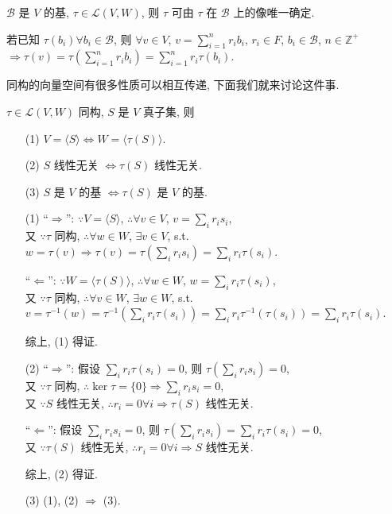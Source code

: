 \documentclass{note}
\begin{document}
\begin{thm}[(课本定理 2.2)]\label{thm-2.4}
    $\mathcal{B}$ 是 $V$ 的基, $\tau\in\mathcal{L}(V,W)$, 则 $\tau$ 可由 $\tau$ 在 $\mathcal{B}$ 上的像唯一确定.
\end{thm}
\begin{pf}
    若已知 $\tau(b_i)\forall b_i\in\mathcal{B}$, 则 $\forall v\in V$, $v=\sum_{i=1}^nr_ib_i$, $r_i\in F$, $b_i\in\mathcal{B}$, $n\in\mathbb{Z}^+$\\
    $\Longrightarrow\tau(v)=\tau\left(\sum_{i=1}^nr_ib_i\right)=\sum_{i=1}^nr_i\tau(b_i)$.
\end{pf}

同构的向量空间有很多性质可以相互传递, 下面我们就来讨论这件事.

\begin{thm}[(课本定理 2.4)]
    $\tau\in\mathcal{L}(V,W)$ 同构, $S$ 是 $V$ 真子集, 则
    \begin{itemize}
        \item[(1)] $V=\langle S\rangle\Longleftrightarrow W=\langle\tau(S)\rangle$.
        \item[(2)] $S$ 线性无关 $\Longleftrightarrow\tau(S)$ 线性无关.
        \item[(3)] $S$ 是 $V$ 的基 $\Longleftrightarrow\tau(S)$ 是 $V$ 的基.
    \end{itemize}
\end{thm}
\begin{pf}
    \begin{itemize}
        \item[(1)] ``$\Longrightarrow$'': $\because V=\langle S\rangle$, $\therefore\forall v\in V$, $v=\sum_ir_is_i$,\\
        又 $\because\tau$ 同构, $\therefore\forall w\in W$, $\exists v\in V$, s.t. $w=\tau(v)\Longrightarrow\tau(v)=\tau\left(\sum_ir_is_i\right)=\sum_ir_i\tau(s_i)$.

        ``$\Longleftarrow$'': $\because W=\langle\tau(S)\rangle$, $\therefore\forall w\in W$, $w=\sum_ir_i\tau(s_i)$,\\
        又 $\because\tau$ 同构, $\therefore\forall v\in W$, $\exists w\in W$, s.t. $v=\tau^{-1}(w)=\tau^{-1}\left(\sum_ir_i\tau(s_i)\right)=\sum_ir_i\tau^{-1}(\tau(s_i))=\sum_ir_i\tau(s_i)$.

        综上, (1) 得证.
        \item[(2)] ``$\Longrightarrow$'': 假设 $\sum_ir_i\tau(s_i)=0$, 则 $\tau\left(\sum_ir_is_i\right)=0$,\\
        又 $\because\tau$ 同构, $\therefore\ker\tau=\{0\}\Longrightarrow\sum_ir_is_i=0$,\\
        又 $\because S$ 线性无关, $\therefore r_i=0\forall i\Longrightarrow\tau(S)$ 线性无关.

        ``$\Longleftarrow$'': 假设 $\sum_ir_is_i=0$, 则 $\tau\left(\sum_ir_is_i\right)=\sum_ir_i\tau(s_i)=0$,\\
        又 $\because\tau(S)$ 线性无关, $\therefore r_i=0\forall i\Longrightarrow S$ 线性无关.

        综上, (2) 得证.
        \item[(3)] (1), (2) $\Longrightarrow$ (3).
    \end{itemize}
\end{pf}
\end{document}
